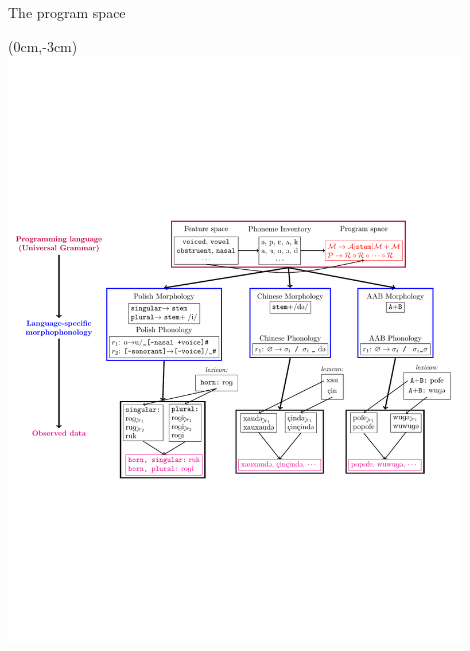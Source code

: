 \documentclass{beamer}
\begin{document}
\begin{frame}{The program space}
\begin{textblock*}{5cm}(0cm,-3cm)
  \includegraphics[pages={1}, width=12cm]{generativeModel.pdf}    \end{textblock*}
  \end{frame}
\end{document}
